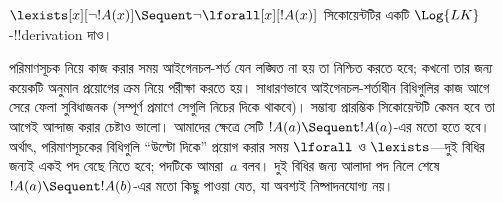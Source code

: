 \documentclass[../../../include/open-logic-section]{subfiles}
\begin{document}


\begin{ex}
$\lexists[x][\lnot !A(x)] \Sequent \lnot \lforall[x][!A(x)]$
সিকোয়েন্টটির একটি $\Log{LK}$-!!{derivation} দাও।

পরিমাণসূচক নিয়ে কাজ করার সময় আইগেনচল-শর্ত যেন লঙ্ঘিত না হয় তা
নিশ্চিত করতে হবে; কখনো তার জন্য কয়েকটি অনুমান প্রয়োগের ক্রম নিয়ে
পরীক্ষা করতে হয়। সাধারণভাবে আইগেনচল-শর্তাধীন বিধিগুলির কাজ আগে সেরে
ফেলা সুবিধাজনক (সম্পূর্ণ প্রমাণে সেগুলি নিচের দিকে থাকবে)। সম্ভাব্য
প্রারম্ভিক সিকোয়েন্টটি কেমন হবে তা আগেই আন্দাজ করার চেষ্টাও ভালো।
আমাদের ক্ষেত্রে সেটি $!A(a) \Sequent !A(a)$-এর মতো হতে হবে। অর্থাৎ,
পরিমাণসূচকের বিধিগুলি “উল্টো দিকে” প্রয়োগ করার সময় $\lforall$ ও
$\lexists$—দুই বিধির জন্যই একই পদ বেছে নিতে হবে; পদটিকে আমরা~$a$ বলব।
দুই বিধির জন্য আলাদা পদ নিলে শেষে $!A(a) \Sequent !A(b)$-এর মতো কিছু
পাওয়া যেত, যা অবশ্যই নিষ্পাদনযোগ্য নয়।


\end{ex}
\end{document}
